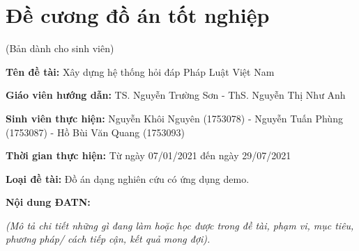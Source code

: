\chapter*{Đề cương đồ án tốt nghiệp}
\label{decuong}

\begin{center}
	(Bản dành cho sinh viên)\\[1.5 cm]
\end{center}

	\textbf{Tên đề tài:} Xây dựng hệ thống hỏi đáp Pháp Luật Việt Nam   
	 
	\textbf{Giáo viên hướng dẫn:} TS. Nguyễn Trường Sơn - ThS. Nguyễn Thị Như Anh 
	
	\textbf{Sinh viên thực hiện:}
			Nguyễn Khôi Nguyên (1753078) - Nguyễn Tuấn Phùng (1753087) - Hồ Bùi Văn Quang (1753093)
			
	\textbf{Thời gian thực hiện:} Từ ngày 07/01/2021 đến ngày 29/07/2021
	 	
	\textbf{Loại đề tài: }Đồ án dạng nghiên cứu có ứng dụng demo.
	
	\textbf{Nội dung ĐATN: }
	
	\textit{(Mô tả chi tiết những gì đang làm hoặc học được trong đề tài, phạm vi, mục tiêu, phương pháp/ cách tiếp cận, kết quả mong đợi).}
	
